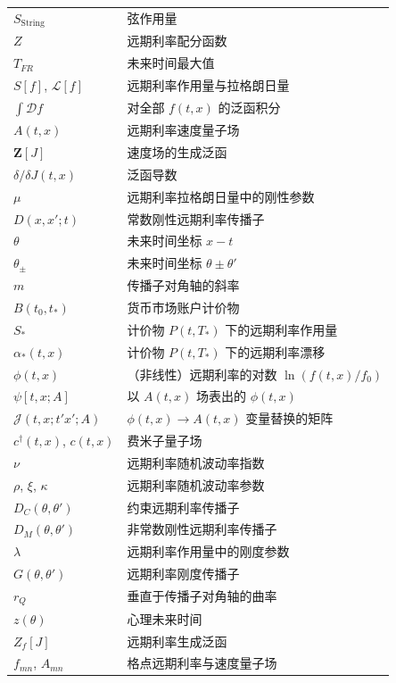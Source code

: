 \begin{center}
\begin{tabular}{@{}L{3.2cm}L{10.6cm}@{}}
\toprule
$S_{\mathrm{String}}$ & 弦作用量 \\
$Z$ & 远期利率配分函数 \\
$T_{FR}$ & 未来时间最大值 \\
$S[f]$, $\mathcal{L}[f]$ & 远期利率作用量与拉格朗日量 \\
$\int\mathcal{D}f$ & 对全部 $f(t,x)$ 的泛函积分 \\
$A(t,x)$ & 远期利率速度量子场 \\
$\mathbf{Z}[J]$ & 速度场的生成泛函 \\
$\delta/\delta J(t,x)$ & 泛函导数 \\
$\mu$ & 远期利率拉格朗日量中的刚性参数 \\
$D(x,x';t)$ & 常数刚性远期利率传播子 \\
$\theta$ & 未来时间坐标 $x-t$ \\
$\theta_{\pm}$ & 未来时间坐标 $\theta\pm\theta'$ \\
$m$ & 传播子对角轴的斜率 \\
$B(t_0,t_*)$ & 货币市场账户计价物 \\
$S_*$ & 计价物 $P(t,T_*)$ 下的远期利率作用量 \\
$\alpha_*(t,x)$ & 计价物 $P(t,T_*)$ 下的远期利率漂移 \\
$\phi(t,x)$ & （非线性）远期利率的对数 $\ln(f(t,x)/f_0)$ \\
$\psi[t,x;A]$ & 以 $A(t,x)$ 场表出的 $\phi(t,x)$ \\
$\mathcal{J}(t,x;t'x';A)$ & $\phi(t,x)\to A(t,x)$ 变量替换的矩阵 \\
$c^{\dagger}(t,x)$, $c(t,x)$ & 费米子量子场 \\
$\nu$ & 远期利率随机波动率指数 \\
$\rho$, $\xi$, $\kappa$ & 远期利率随机波动率参数 \\
$D_C(\theta,\theta')$ & 约束远期利率传播子 \\
$D_M(\theta,\theta')$ & 非常数刚性远期利率传播子 \\
$\lambda$ & 远期利率作用量中的刚度参数 \\
$G(\theta,\theta')$ & 远期利率刚度传播子 \\
$r_Q$ & 垂直于传播子对角轴的曲率 \\
$z(\theta)$ & 心理未来时间 \\
$Z_f[J]$ & 远期利率生成泛函 \\
$f_{mn}$, $A_{mn}$ & 格点远期利率与速度量子场 \\
\bottomrule
\end{tabular}
\end{center}

